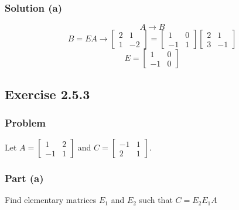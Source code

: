 \documentclass[12pt]{article}
\begin{document}
\subsubsection*{Solution (a)}
\[
  A \longrightarrow B
\]
\vspace{0.25in}
\[
  B = EA \longrightarrow \begin{bmatrix}
    2 & 1\\ 
    1 & -2 
  \end{bmatrix} = \begin{bmatrix}
    1 & 0\\ 
    -1 & 1 
  \end{bmatrix}\begin{bmatrix}
    2 & 1\\ 
    3 & -1
  \end{bmatrix}
\]
\[
  E = \begin{bmatrix}
    1 & 0\\ 
    -1 & 0 
  \end{bmatrix}
\]
\vspace{2in}
\subsection*{Exercise 2.5.3}
\subsubsection*{Problem}
Let $A = \begin{bmatrix}
  1 & 2\\ 
  -1 & 1 
\end{bmatrix}
$ and $C = \begin{bmatrix}
  -1 & 1\\ 
  2 & 1 
\end{bmatrix}
$. 
\subsubsection*{Part (a)}
Find elementary matrices $E_1$ and $E_2$ such that $C = E_2E_1A$
\end{document}
